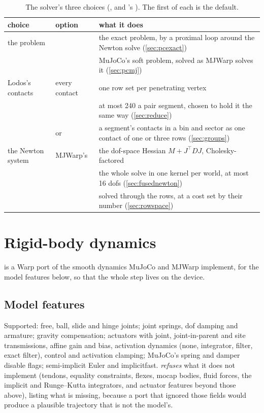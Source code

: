 \begin{table}[t]
\centering
\caption{The solver's three choices (, and 's ). The first of each is the default.}
\label{tab:choices}
\small
\begin{tabularx}{\linewidth}{@{}L{26mm}L{44mm}Y@{}}
\toprule
choice & option & what it does \\
\midrule
the problem &  & the exact problem, by a proximal loop around the Newton solve (\cref{sec:pcexact}) \\
 &  & MuJoCo's soft problem, solved as MJWarp solves it (\cref{sec:pcmj}) \\
\addlinespace
Lodos's contacts & every contact & one row set per penetrating vertex \\
 &  & at most 240 a pair segment, chosen to hold it the same way (\cref{sec:reduce}) \\
 &  or  & a segment's contacts in a bin and sector as one contact of one or three rows (\cref{sec:groups}) \\
\addlinespace
the Newton system & MJWarp's & the dof-space Hessian $M + J^\top D J$, Cholesky-factored \\
 &  & the whole solve in one kernel per world, at most 16 dofs (\cref{sec:fusednewton}) \\
 &  & solved through the rows, at a cost set by their number (\cref{sec:rowspace}) \\
\bottomrule
\end{tabularx}
\end{table}

\section{Rigid-body dynamics}\label{sec:rbd}

 is a Warp port of the smooth dynamics MuJoCo and MJWarp implement, for the model features below, so that the whole step lives on the device.

\subsection{Model features}\label{sec:features}

Supported: free, ball, slide and hinge joints; joint springs, dof damping and armature; gravity compensation; actuators with joint, joint-in-parent and site transmissions, affine gain and bias, activation dynamics (none, integrator, filter, exact filter), control and activation clamping; MuJoCo's spring and damper disable flags; semi-implicit Euler and implicitfast.  \emph{refuses} what it does not implement (tendons, equality constraints, flexes, mocap bodies, fluid forces, the implicit and Runge--Kutta integrators, and actuator features beyond those above), listing what is missing, because a port that ignored those fields would produce a plausible trajectory that is not the model's.

